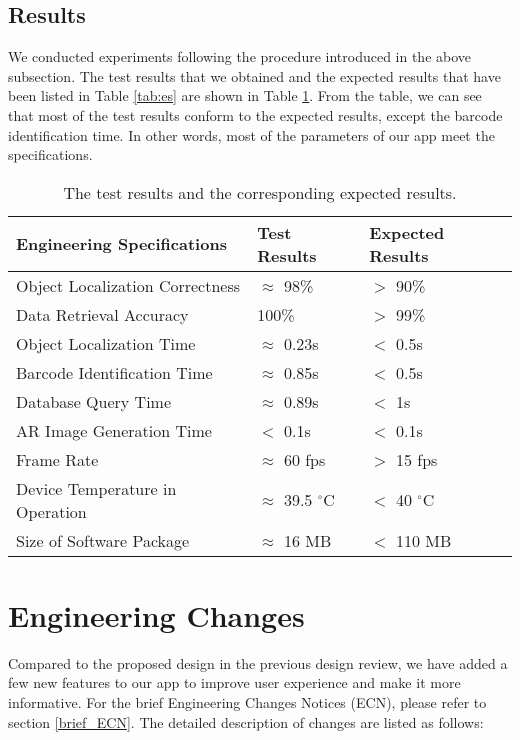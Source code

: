 \documentclass[11pt,a4paper]{article}
\begin{document}
\begin{onehalfspace}
\subsection{Results}
We conducted experiments following the procedure introduced in the above subsection. The test results that we obtained and the expected results that have been listed in Table \ref{tab:es} are shown in Table \ref{tab:res}. From the table, we can see that most of the test results conform to the expected results, except the barcode identification time. In other words, most of the parameters of our app meet the specifications. 

\begin{table}[H]
    \centering
    \caption{The test results and the corresponding expected results.}
    \begin{tabular}{|l|p{4cm}|p{4cm}|}
        \hline
        \textbf{Engineering Specifications} & \textbf{Test Results} & \textbf{Expected Results} \\
        \hline
        Object Localization Correctness & $\approx$ 98\% & $>$ 90\% \\
        \hline
        Data Retrieval Accuracy & 100\% & $>$ 99\%\\
        \hline
        Object Localization Time & $\approx$ 0.23s & $<$ 0.5s\\
        \hline
        Barcode Identification Time &  \cellcolor[RGB]{255, 127, 36} $\approx$ 0.85s & $<$ 0.5s\\
        \hline
        Database Query Time & $\approx$ 0.89s & $<$ 1s\\
        \hline
        AR Image Generation Time & $<$ 0.1s & $<$ 0.1s\\
        \hline
        Frame Rate & $\approx$ 60 fps & $>$ 15 fps\\
        \hline
        Device Temperature in Operation & $\approx$ 39.5 $^\circ$C & $<$ 40 $^\circ$C \\
        \hline
        Size of Software Package & $\approx$ 16 MB & $<$ 110 MB\\
        \hline
    \end{tabular}
    \label{tab:res}
\end{table}

\section{Engineering Changes\label{sec:ECN}}

Compared to the proposed design in the previous design review, we have added a few new features to our app to improve user experience and make it more informative. For the brief Engineering Changes Notices (ECN), please refer to section \ref{brief_ECN}. The detailed description of changes are listed as follows:


\end{onehalfspace}
\end{document}
